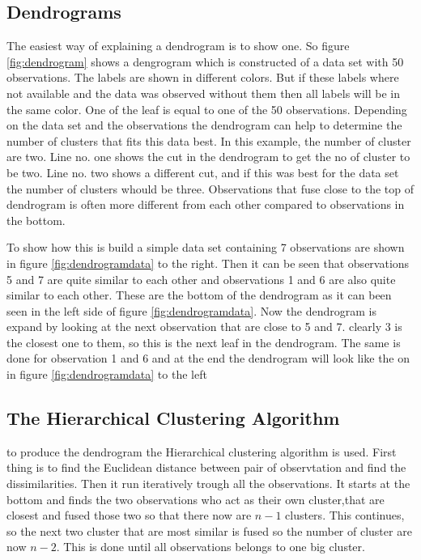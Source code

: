 \subsection{Dendrograms}
The easiest way of explaining a dendrogram is to show one. So figure \ref{fig:dendrogram} shows a dengrogram which is constructed of a data set with 50 observations.
The labels are shown in different colors. But if these labels where not available and the data was observed without them then all labels will be in the same color. 
One of the leaf is equal to one of the 50 observations. 
Depending on the data set and the observations the dendrogram can help to determine the number of clusters that fits this data best. In this example, the number of cluster are two. Line no. one shows the cut in the dendrogram to get the no of cluster to be two. Line no. two shows a different cut, and if this was best for the data set the number of clusters whould be three.
Observations that fuse close to the top of dendrogram is often more different from each other compared to  observations in the bottom. 


\FloatBarrier
To show how this is build a simple data set containing 7 observations are shown in figure \ref{fig:dendrogramdata} to the right.
Then it can be seen that observations 5 and 7 are quite similar to each other and observations 1 and 6 are also quite similar to each other. These are the bottom of the dendrogram as it can been seen in the left side of figure \ref{fig:dendrogramdata}. Now the dendrogram is expand by looking at the next observation that are close to 5 and 7. clearly 3 is the closest one to them, so this is the next leaf in the dendrogram. The same is done for observation 1 and 6 and at the end the dendrogram will look like the on in figure \ref{fig:dendrogramdata} to the left


\FloatBarrier
\subsection{The Hierarchical Clustering Algorithm}
to produce the dendrogram the Hierarchical clustering algorithm is used. First thing is to find the Euclidean distance between pair of observtation and find the dissimilarities.
Then it run iteratively trough all the observations. It starts at the bottom and finds the two observations who act as their own cluster,that are closest and fused those two so that there now are $n-1$ clusters. This continues, so the next two cluster that are most similar is fused so the number of cluster are now $n-2$. This is done until all observations belongs to one big cluster.

